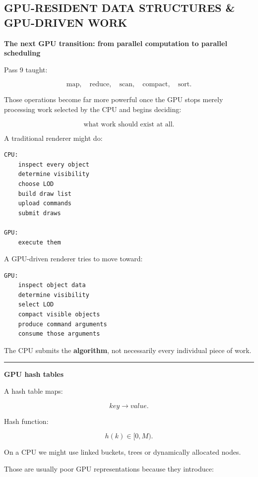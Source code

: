 \subsection{GPU-RESIDENT DATA STRUCTURES \& GPU-DRIVEN WORK}\label{01-foundations-i-ch011-gpu-resident-data-structures-gpu-driven-work}

\textbf{The next GPU transition: from parallel computation to parallel scheduling}

Pass 9 taught:

\[
\text{map},
\quad
\text{reduce},
\quad
\text{scan},
\quad
\text{compact},
\quad
\text{sort}.
\]

Those operations become far more powerful once the GPU stops merely processing work selected by the CPU and begins deciding:

\[
\boxed{
\text{what work should exist at all}.
}
\]

A traditional renderer might do:

\protect{}\label{p10-cpu-driven}%
\begin{verbatim}
CPU:
    inspect every object
    determine visibility
    choose LOD
    build draw list
    upload commands
    submit draws

GPU:
    execute them
\end{verbatim}

A GPU-driven renderer tries to move toward:

\protect{}\label{p10-gpu-driven}%
\begin{verbatim}
GPU:
    inspect object data
    determine visibility
    select LOD
    compact visible objects
    produce command arguments
    consume those arguments
\end{verbatim}

The CPU submits the \textbf{algorithm}, not necessarily every individual piece of work.

\begin{center}\rule{0.5\linewidth}{0.5pt}\end{center}

\textbf{GPU hash tables}

A hash table maps:

\[
key\rightarrow value.
\]

Hash function:

\[
h(k)\in[0,M).
\]

On a CPU we might use linked buckets, trees or dynamically allocated nodes.

Those are usually poor GPU representations because they introduce:

